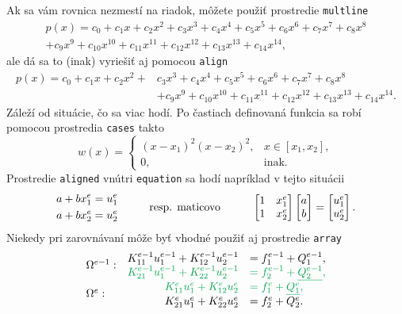 Ak sa vám rovnica nezmestí na riadok, môžete použiť prostredie \verb|multline|
\begin{multline}
	p(x) = c_0+c_1x+c_2x^2+c_3x^3+c_4x^4+c_5x^5+c_6x^6+c_7x^7+c_8x^8\\ 
	+c_9x^9+c_{10}x^{10}+c_{11}x^{11}+c_{12}x^{12}+c_{13}x^{13}+c_{14}x^{14},
\end{multline}
ale dá sa to (inak) vyriešiť aj pomocou \verb|align|
\begin{align}
	p(x) = c_0+c_1x+c_2x^2+&c_3x^3+c_4x^4+c_5x^5+c_6x^6+c_7x^7+c_8x^8 \nonumber\\ 
	&+c_9x^9+c_{10}x^{10}+c_{11}x^{11}+c_{12}x^{12}+c_{13}x^{13}+c_{14}x^{14}. \label{eq:long_equation}
\end{align}
Záleží od situácie, čo sa viac hodí. Po častiach definovaná funkcia sa robí pomocou prostredia \verb|cases| takto
\begin{equation*}
	w(x)=
	\begin{cases}
		(x-x_1)^2(x-x_2)^2,& x\in[x_1,x_2],\\
			0,& \mbox{inak}.
	\end{cases}
\end{equation*}
Prostredie \verb|aligned| vnútri \verb|equation| sa hodí napríklad v tejto situácii
\begin{equation}
	\begin{aligned}
		a + b x_1^e&=u_1^e\\
		a + b x_2^e&= u_2^e
	\end{aligned}
	\hskip 1cm \mbox{resp. maticovo} \hskip 1cm 
	\begin{bmatrix}
		1 & x_1^e \\ 
		1 & x_2^e
	\end{bmatrix}
	\begin{bmatrix}
		a  \\ 
		b 
	\end{bmatrix}=
	\begin{bmatrix}
		u_1^e  \\ 
		u_2^e 
	\end{bmatrix}.
\end{equation}
Niekedy pri zarovnávaní môže byť vhodné použiť aj prostredie \verb|array|
\begin{align*}
	\begin{array}{lrl}
		\text{\multirow{2}{*}{$\Omega^{e-1}:$}} & K_{11}^{e-1} u_1^{e-1} + K_{12}^{e-1} u_2^{e-1} & = f_1^{e-1} + Q_1^{e-1}, \\
		& \color{Green} K_{21}^{e-1} u_1^{e-1} + K_{22}^{e-1} u_2^{e-1} & \color{Green}= f_2^{e-1} + \underline{Q_2^{e-1}}, \\
		\text{\multirow{2}{*}{$\Omega^e:$}} & \color{Green}K_{11}^e u_1^e + K_{12}^e u_2^e & \color{Green}= f_1^e + \underline{Q_1^e}, \\
		& K_{21}^e u_1^e + K_{22}^e u_2^e & = f_2^e + Q_2^e.
	\end{array}
\end{align*}
